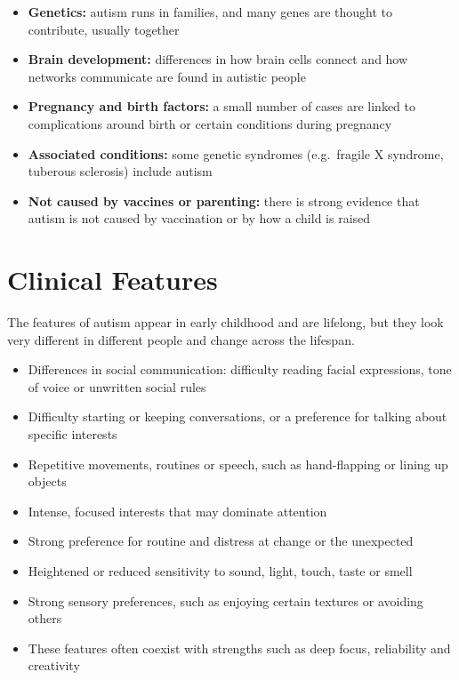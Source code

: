 \begin{itemize}
    \item \textbf{Genetics:} autism runs in families, and many genes are thought to contribute, usually together
    \item \textbf{Brain development:} differences in how brain cells connect and how networks communicate are found in autistic people
    \item \textbf{Pregnancy and birth factors:} a small number of cases are linked to complications around birth or certain conditions during pregnancy
    \item \textbf{Associated conditions:} some genetic syndromes (e.g.\ fragile X syndrome, tuberous sclerosis) include autism
    \item \textbf{Not caused by vaccines or parenting:} there is strong evidence that autism is not caused by vaccination or by how a child is raised
\end{itemize}

\section*{Clinical Features}
The features of autism appear in early childhood and are lifelong, but they look very different in different people and change across the lifespan.

\begin{itemize}
    \item Differences in social communication: difficulty reading facial expressions, tone of voice or unwritten social rules
    \item Difficulty starting or keeping conversations, or a preference for talking about specific interests
    \item Repetitive movements, routines or speech, such as hand-flapping or lining up objects
    \item Intense, focused interests that may dominate attention
    \item Strong preference for routine and distress at change or the unexpected
    \item Heightened or reduced sensitivity to sound, light, touch, taste or smell
    \item Strong sensory preferences, such as enjoying certain textures or avoiding others
    \item These features often coexist with strengths such as deep focus, reliability and creativity
\end{itemize}

